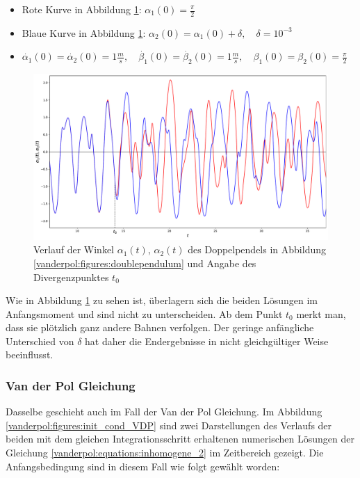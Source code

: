 \begin{itemize}
\item
Rote Kurve in Abbildung \ref{vanderpol:figures:init_cond_dbl_pend}: $\alpha_1(0) = \frac{\pi}{2}$
\item
Blaue Kurve in Abbildung \ref{vanderpol:figures:init_cond_dbl_pend}: $\alpha_2(0) = \alpha_1(0) + \delta, \quad \delta = 10^{-3}$
\item
$\dot{\alpha_1}(0) = \dot{\alpha_2}(0)= 1 \frac{m}{s}, \quad \dot{\beta_1}(0) = \dot{\beta_2}(0)= 1 \frac{m}{s}, \quad \beta_1(0)=\beta_2(0)=\displaystyle\frac{\pi}{2}$
\end{itemize}

\begin{figure}
\includegraphics[width=\textwidth]{papers/vanderpol/figures/initial_cond_DBLPEND.pdf}
\caption{Verlauf der Winkel $\alpha_1(t)$, $\alpha_2(t)$ des Doppelpendels in Abbildung \ref{vanderpol:figures:doublependulum} und Angabe des Divergenzpunktes $t_0$\label{vanderpol:figures:init_cond_dbl_pend}}
\end{figure}
\noindent Wie in Abbildung \ref{vanderpol:figures:init_cond_dbl_pend} zu sehen ist, überlagern sich die beiden Lösungen im Anfangsmoment und sind nicht zu unterscheiden. Ab dem Punkt $t_0$ merkt man, dass sie plötzlich ganz andere Bahnen verfolgen. Der geringe anfängliche Unterschied von $\delta$ hat daher die Endergebnisse in nicht gleichgültiger Weise beeinflusst.
\subsubsection{Van der Pol Gleichung}
\label{vanderpol:subsubsection:vdp}
Dasselbe geschieht auch im Fall der Van der Pol Gleichung. Im  Abbildung \ref{vanderpol:figures:init_cond_VDP} sind zwei Darstellungen des Verlaufs der beiden mit dem gleichen Integrationsschritt erhaltenen numerischen Lösungen der Gleichung \eqref{vanderpol:equations:inhomogene_2} im Zeitbereich gezeigt. Die Anfangsbedingung sind in diesem Fall wie folgt gewählt worden:

